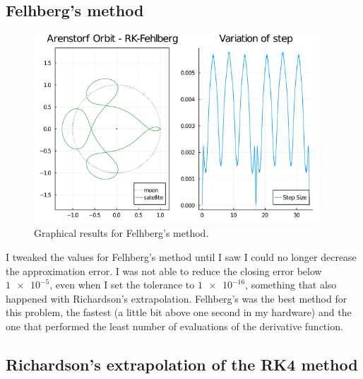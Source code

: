 \documentclass[12pt, onside]{article}
\begin{document}


\subsection{Felhberg's method}

\begin{figure}[H]
    \centering
    \includegraphics[width=0.95\textwidth]{media/arenstorf/fehlberg.png}
    \caption{Graphical results for Felhberg's method.}
\end{figure}

    I tweaked the values for Felhberg's method until I saw I could no longer decrease the
approximation error.
I was not able to reduce the closing error below $\num{1e-5}$,
even when I set the tolerance to $\num{1e-16}$,
something that also happened with Richardson's extrapolation.
Felhberg's was the best method for this problem,
the fastest (a little bit above one second in my hardware)
and the one that performed the least number of evaluations of the derivative function.



\subsection{Richardson's extrapolation of the RK4 method}
\end{document}
